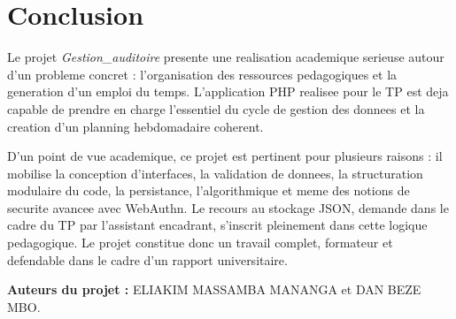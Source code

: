 \documentclass[12pt,a4paper]{article}
\begin{document}
\section{Conclusion}
Le projet \textit{Gestion\_auditoire} presente une realisation academique serieuse autour d'un probleme concret : l'organisation des ressources pedagogiques et la generation d'un emploi du temps. L'application PHP realisee pour le TP est deja capable de prendre en charge l'essentiel du cycle de gestion des donnees et la creation d'un planning hebdomadaire coherent.

D'un point de vue academique, ce projet est pertinent pour plusieurs raisons : il mobilise la conception d'interfaces, la validation de donnees, la structuration modulaire du code, la persistance, l'algorithmique et meme des notions de securite avancee avec WebAuthn. Le recours au stockage JSON, demande dans le cadre du TP par l'assistant encadrant, s'inscrit pleinement dans cette logique pedagogique. Le projet constitue donc un travail complet, formateur et defendable dans le cadre d'un rapport universitaire.

\vfill

\noindent\textbf{Auteurs du projet :} ELIAKIM MASSAMBA MANANGA et DAN BEZE MBO.
\end{document}
